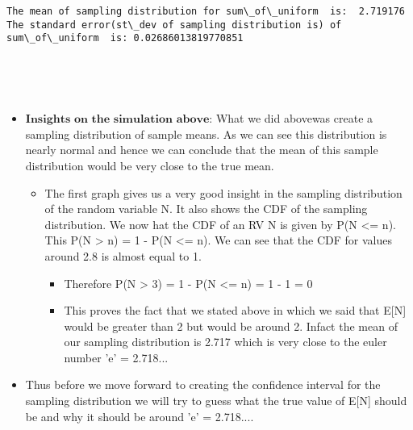\documentclass[11pt]{article}
\begin{document}
    \begin{Verbatim}[commandchars=\\\{\}]
The mean of sampling distribution for sum\_of\_uniform  is:  2.719176
The standard error(st\_dev of sampling distribution is) of  sum\_of\_uniform  is: 0.02686013819770851

    \end{Verbatim}

    \begin{center}
    \end{center}
    { \hspace*{\fill} \\}
    
    \begin{center}
    \end{center}
    { \hspace*{\fill} \\}
    
    \begin{itemize}
\item
  \(\textbf{Insights on the simulation above}\): What we did abovewas
  create a sampling distribution of sample means. As we can see this
  distribution is nearly normal and hence we can conclude that the mean
  of this sample distribution would be very close to the true mean.

  \begin{itemize}
  \item
    The first graph gives us a very good insight in the sampling
    distribution of the random variable N. It also shows the CDF of the
    sampling distribution. We now hat the CDF of an RV N is given by P(N
    \textless{}= n). This P(N \textgreater{} n) = 1 - P(N \textless{}=
    n). We can see that the CDF for values around 2.8 is almost equal to
    1.

    \begin{itemize}
    \item
      Therefore P(N \textgreater{} 3) = 1 - P(N \textless{}= n) = 1 - 1
      = 0
    \item
      This proves the fact that we stated above in which we said that
      E{[}N{]} would be greater than 2 but would be around 2. Infact the
      mean of our sampling distribution is 2.717 which is very close to
      the euler number 'e' = 2.718...
    \end{itemize}
  \end{itemize}
\item
  Thus before we move forward to creating the confidence interval for
  the sampling distribution we will try to guess what the true value of
  E{[}N{]} should be and why it should be around 'e' = 2.718....
\end{itemize}
\end{document}
